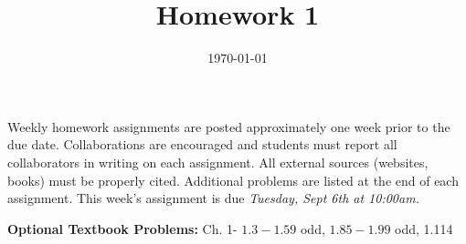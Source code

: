 \documentclass[12pt]{article}
\title{\textbf{Homework 1}}
\date{\vspace{-2em}\today}
\begin{document}
\maketitle 

Weekly homework assignments are posted approximately one week prior to the
due date. Collaborations are encouraged and students must report all collaborators
in writing on each assignment. All external sources (websites, books) must be
properly cited. Additional problems are listed at the end of each assignment.
This week's assignment is due \textit{Tuesday, Sept 6th at 10:00am.}


\vfill

\textbf{Optional Textbook Problems:} Ch. 1- $1.3-1.59$ odd, $1.85-1.99$ odd, 1.114
\end{document}
